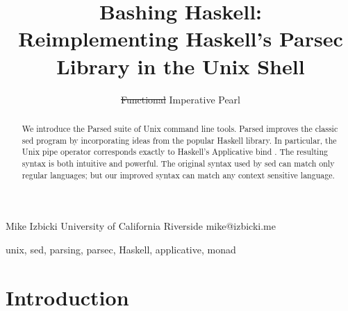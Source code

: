 \documentclass{sigplanconf}
\newcommand{\parsed}{{\ttfamily parsed}~}
\newcommand{\sh}[1]{{\ttfamily {#1}}}
\begin{document}
\setlength{\pdfpageheight}{\paperheight}
\setlength{\pdfpagewidth}{\paperwidth}


\title{Bashing Haskell: \\Reimplementing Haskell's Parsec Library in the Unix Shell}
\subtitle{\sout{Functional} Imperative Pearl}
\authorinfo
    {Mike Izbicki}
    {University of California Riverside}
    {mike@izbicki.me}

\maketitle

\begin{abstract}
We introduce the Parsed suite of Unix command line tools.
Parsed improves the classic sed program by incorporating ideas from the popular \sh{parsec} Haskell library.
In particular, the Unix pipe operator \sh{(|)} corresponds exactly to Haskell's Applicative bind \sh{(*>)}.
The resulting syntax is both intuitive and powerful.
The original syntax used by sed can match only regular languages;
but our improved syntax can match any context sensitive language.
\end{abstract}

\keywords unix, sed, parsing, parsec, Haskell, applicative, monad

\section{Introduction}
\end{document}

